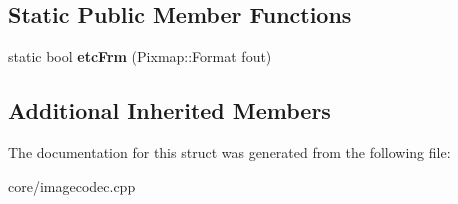 \subsection*{Static Public Member Functions}
\begin{DoxyCompactItemize}
\item 
\hypertarget{struct_tempest_1_1_e_t_c_codec_a917c7da2294cc724f85ae2d82170feb0}{static bool {\bfseries etc\+Frm} (Pixmap\+::\+Format fout)}\label{struct_tempest_1_1_e_t_c_codec_a917c7da2294cc724f85ae2d82170feb0}

\end{DoxyCompactItemize}
\subsection*{Additional Inherited Members}


The documentation for this struct was generated from the following file\+:\begin{DoxyCompactItemize}
\item 
core/imagecodec.\+cpp\end{DoxyCompactItemize}
